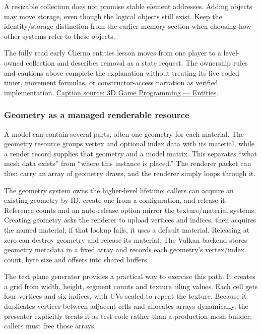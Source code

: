 A resizable collection does not promise stable element addresses. Adding objects may move storage, even though the logical objects still exist. Keep the identity/storage distinction from the earlier memory section when choosing how other systems refer to these objects.

The fully read early Cherno entities lesson moves from one player to a level-owned collection and describes removal as a state request. The ownership rules and cautions above complete the explanation without treating its live-coded timer, movement formulas, or constructor-access narration as verified implementation. \href{https://www.youtube.com/watch?v=J3wfaJk_IMw}{Caption source: 3D Game Programming --- Entities}.

\subsubsection{Geometry as a managed renderable resource}\label{06-engine-ii-ch031-geometry-as-a-managed-renderable-resource}

\hypertarget{06-engine-ii-ch031-geometry-as-a-managed-renderable-resource}{}

A model can contain several parts, often one geometry for each material. The geometry resource groups vertex and optional index data with its material, while a render record supplies that geometry and a model matrix. This separates ``what mesh data exists'' from ``where this instance is placed.'' The renderer packet can then carry an array of geometry draws, and the renderer simply loops through it.

The geometry system owns the higher-level lifetime: callers can acquire an existing geometry by ID, create one from a configuration, and release it. Reference counts and an auto-release option mirror the texture/material systems. Creating geometry asks the renderer to upload vertices and indices, then acquires the named material; if that lookup fails, it uses a default material. Releasing at zero can destroy geometry and release its material. The Vulkan backend stores geometry metadata in a fixed array and records each geometry's vertex/index count, byte size and offsets into shared buffers.

The test plane generator provides a practical way to exercise this path. It creates a grid from width, height, segment counts and texture tiling values. Each cell gets four vertices and six indices, with UVs scaled to repeat the texture. Because it duplicates vertices between adjacent cells and allocates arrays dynamically, the presenter explicitly treats it as test code rather than a production mesh builder; callers must free those arrays.


